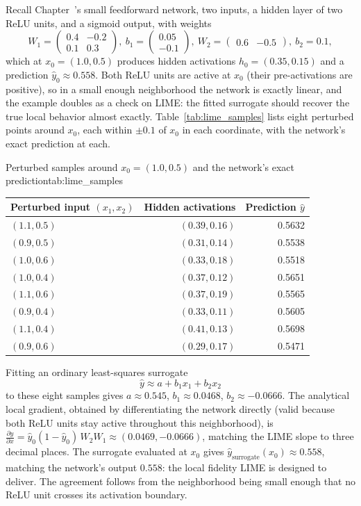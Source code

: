\documentclass[../ai_in_finance]{subfiles}
\begin{document}
Recall Chapter~'s small feedforward network, two inputs, a hidden layer of two ReLU units, and a sigmoid output, with weights
$$W_1 = \begin{pmatrix}0.4 & -0.2\\ 0.1 & 0.3\end{pmatrix},\ b_1 = \begin{pmatrix}0.05\\-0.1\end{pmatrix},  \ W_2 = \begin{pmatrix}0.6 & -0.5\end{pmatrix}, \ b_2 = 0.1,$$
which at $x_0 = (1.0, 0.5)$ produces hidden activations $h_0 = (0.35, 0.15)$ and a prediction $\hat y_0 \approx 0.558$. Both ReLU units are active at $x_0$ (their pre-activations are positive), so in a small enough neighborhood the network is exactly linear, and the example doubles as a check on LIME: the fitted surrogate should recover the true local behavior almost exactly. Table~\ref{tab:lime_samples} lists eight perturbed points around $x_0$, each within $\pm 0.1$ of $x_0$ in each coordinate, with the network's exact prediction at each.

\begin{booktable}[htbp]{Perturbed samples around $x_0=(1.0,0.5)$ and the network's exact prediction}{tab:lime_samples}
\begin{tabular}{lrr}
\toprule
Perturbed input $(x_1,x_2)$ & Hidden activations & Prediction $\hat y$ \\
\midrule
$(1.1, 0.5)$ & $(0.39, 0.16)$ & 0.5632 \\
$(0.9, 0.5)$ & $(0.31, 0.14)$ & 0.5538 \\
$(1.0, 0.6)$ & $(0.33, 0.18)$ & 0.5518 \\
$(1.0, 0.4)$ & $(0.37, 0.12)$ & 0.5651 \\
$(1.1, 0.6)$ & $(0.37, 0.19)$ & 0.5565 \\
$(0.9, 0.4)$ & $(0.33, 0.11)$ & 0.5605 \\
$(1.1, 0.4)$ & $(0.41, 0.13)$ & 0.5698 \\
$(0.9, 0.6)$ & $(0.29, 0.17)$ & 0.5471 \\
\bottomrule
\end{tabular}
\end{booktable}

Fitting an ordinary least-squares surrogate
\begin{equation}
\hat y \approx a + b_1 x_1 + b_2 x_2
\label{eq:xai-lime-surrogate}
\end{equation}
to these eight samples gives $a \approx 0.545$, $b_1 \approx 0.0468$, $b_2 \approx -0.0666$. The analytical local gradient, obtained by differentiating the network directly (valid because both ReLU units stay active throughout this neighborhood), is $\frac{\partial \hat y}{\partial x} = \hat y_0(1-\hat y_0)\, W_2 W_1 \approx (0.0469, -0.0666)$, matching the LIME slope to three decimal places. The surrogate evaluated at $x_0$ gives $\hat y_{\text{surrogate}}(x_0) \approx 0.558$, matching the network's output $0.558$: the local fidelity LIME is designed to deliver. The agreement follows from the neighborhood being small enough that no ReLU unit crosses its activation boundary.
\end{document}
